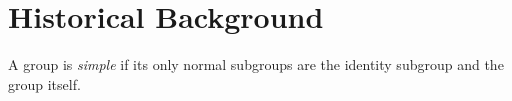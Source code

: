 \section{Historical Background}

\begin{definition}
	A group is \textit{simple} if its only normal subgroups are the identity subgroup and the group itself.
\end{definition}
